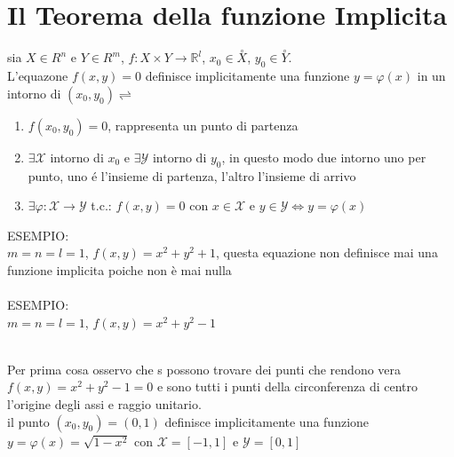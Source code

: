 \section{Il Teorema della funzione Implicita}
sia $X\in R^n$ e $Y\in R^m$, $f:X\times Y\to \mathbb{R}^l$, $x_0\in \overset{\circ}{X}$, $y_0\in \overset{\circ}{Y}$.\\
L'equazone $f(x,y)=0$ definisce implicitamente una funzione $y=\varphi(x)$ in un intorno di $(x_0,y_0) \rightleftharpoons$
\begin{enumerate}
	\item $f(x_0,y_0)=0$, rappresenta un punto di partenza 
	\item $\exists \mathcal{X}$ intorno di $x_0$ e $\exists \mathcal{Y}$ intorno di $y_0$, in questo modo due intorno uno per punto, uno \'e l'insieme di partenza, l'altro l'insieme di arrivo
	\item $\exists\varphi:\mathcal{X}\rightarrow\mathcal{Y}$ t.c.: $f(x,y)=0$ con $x\in\mathcal{X}$ e $y\in\mathcal{Y} \Leftrightarrow y=\varphi(x)$
\end{enumerate}
ESEMPIO:\\
$m=n=l=1$, $f(x,y)=x^2+y^2+1$, questa equazione non definisce mai una funzione implicita poiche non è mai nulla\\
\\
ESEMPIO:\\
$m=n=l=1$, $f(x,y)=x^2+y^2-1$\\
	\\
	Per prima cosa osservo che s possono trovare dei punti che rendono vera $f(x,y)=x^2+y^2-1=0$ e sono tutti i punti della circonferenza di centro l'origine degli assi e raggio unitario.\\
	il punto $(x_0,y_0)=(0,1)$ definisce implicitamente una funzione $y=\varphi(x)=\sqrt{1-x^2}$ con $\mathcal{X}=[-1,1]$ e $\mathcal{Y}=[0,1]$\\
